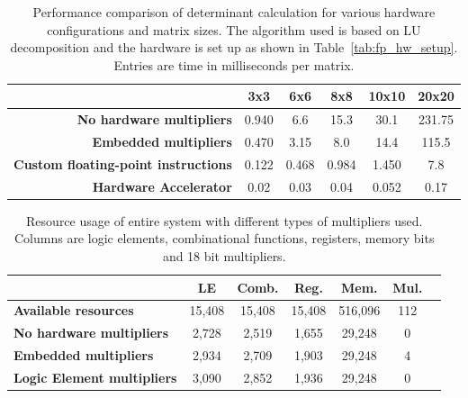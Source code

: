 \documentclass[]{article}
\begin{document}
\begin{table}[bp]
	\caption{Performance comparison of determinant calculation for various hardware configurations and matrix sizes. The algorithm used is based on LU decomposition and the hardware is set up as shown in Table~\ref{tab:fp_hw_setup}. Entries are time in milliseconds per matrix.}
	\label{tab:sw_perf}
	\begin{center}
		\begin{tabular}{r|ccccc}
		\hline

		\hline
			& \textbf{3x3}	& \textbf{6x6}	& \textbf{8x8}	& \textbf{10x10}	& \textbf{20x20} \\ 
		\hline
			\textbf{No hardware multipliers}
			& 0.940			& 6.6			& 15.3			& 30.1				& 231.75 \\
			\textbf{Embedded multipliers}
			& 0.470			& 3.15			& 8.0			& 14.4				& 115.5 \\
			\textbf{Custom floating-point instructions}
			& 0.122			& 0.468			& 0.984			& 1.450				& 7.8 \\
			\textbf{Hardware Accelerator}
			& 0.02 			& 0.03 			& 0.04 			& 0.052 			& 0.17 \\
		\hline

		\hline
		\end{tabular}
	\end{center}
\end{table}

\begin{table}[bp]
	\caption{Resource usage of entire system with different types of multipliers used. Columns are logic elements, combinational functions, registers, memory bits and 18 bit multipliers.}
	\label{tab:sw_resourceuse}
	\begin{center}
		\begin{tabular}{l|cccccc}
		\hline

		\hline
			& \textbf{LE} 	& \textbf{Comb.} 	& \textbf{Reg.} 	& \textbf{Mem.} 	& \textbf{Mul.} \\

		\hline
			\textbf{Available resources}
			& 15,408 	& 15,408 	& 15,408	& 516,096 	& 112 \\
			\textbf{No hardware multipliers}
			& 2,728 	& 2,519 	& 1,655 	& 29,248 	& 0 \\
			\textbf{Embedded multipliers}
			& 2,934		& 2,709		& 1,903		& 29,248	& 4 \\
			\textbf{Logic Element multipliers}
			& 3,090		& 2,852		& 1,936		& 29,248	& 0 \\
		\hline

		\hline
		\end{tabular}
	\end{center}
\end{table}
\end{document}
